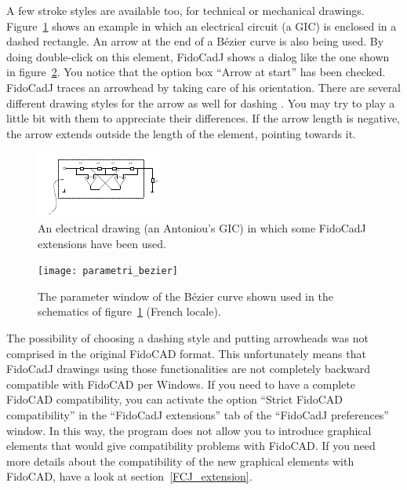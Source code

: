 \documentclass[10pt,a4paper,twoside]{scrreprt}
\begin{document}
A few stroke styles are available too, for technical or mechanical drawings. Figure~\ref{fig_gyrator} shows an example in which an electrical circuit (a GIC) is enclosed in a dashed rectangle. An arrow at the end of a B\'ezier curve is also being used. By doing double-click on this element, FidoCadJ shows a dialog like the one shown in figure~\ref{fig_parametri_bezier}. You notice that the option box ``Arrow at start'' has been checked. FidoCadJ traces an arrowhead by taking care of his orientation.
There are several different drawing styles for the arrow as well for dashing . You may try to play a little bit with them to appreciate their differences. If the arrow length is negative, the arrow extends outside the length of the element, pointing towards it.

\begin{figure}
\includegraphics[width=\textwidth]{gyrator}
\caption{An electrical drawing (an Antoniou's GIC) in which some FidoCadJ extensions have been used.}
\label{fig_gyrator}
\end{figure}
\begin{figure}
\centering
\texttt{[image: parametri\_bezier]}
\caption{The parameter window of the B\'ezier curve shown used in the schematics of figure~\ref{fig_gyrator} (French locale).}
\label{fig_parametri_bezier}
\end{figure}
The possibility of choosing a dashing style and putting arrowheads was not comprised in the original FidoCAD format. This unfortunately means that FidoCadJ drawings using those functionalities are not completely backward compatible with FidoCAD per Windows.
If you need to have a complete FidoCAD compatibility, you can activate the option ``Strict FidoCAD compatibility'' in the ``FidoCadJ extensions'' tab of the ``FidoCadJ preferences'' window. In this way, the program does not allow you to introduce graphical elements that would give compatibility problems with FidoCAD. If you need more details about the compatibility of the new graphical elements with FidoCAD, have a look at section~\ref{FCJ_extension}.
\end{document}
